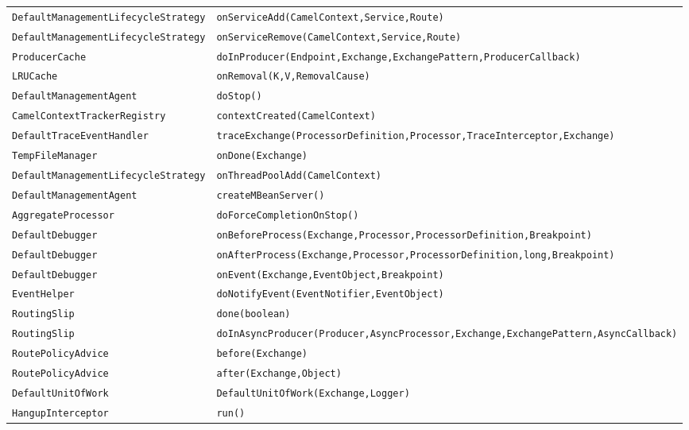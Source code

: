 \begin{center}
\begin{longtable}{ll}
\lstinline/DefaultManagementLifecycleStrategy/&{\lstinline/onServiceAdd(CamelContext,Service,Route)/}\\
\lstinline/DefaultManagementLifecycleStrategy/&{\lstinline/onServiceRemove(CamelContext,Service,Route)/}\\
\lstinline/ProducerCache/&{\lstinline/doInProducer(Endpoint,Exchange,ExchangePattern,ProducerCallback)/}\\
\lstinline/LRUCache/&{\lstinline/onRemoval(K,V,RemovalCause)/}\\
\lstinline/DefaultManagementAgent/&{\lstinline/doStop()/}\\
\lstinline/CamelContextTrackerRegistry/&{\lstinline/contextCreated(CamelContext)/}\\
\lstinline/DefaultTraceEventHandler/&{\lstinline/traceExchange(ProcessorDefinition,Processor,TraceInterceptor,Exchange)/}\\
\lstinline/TempFileManager/&{\lstinline/onDone(Exchange)/}\\
\lstinline/DefaultManagementLifecycleStrategy/&{\lstinline/onThreadPoolAdd(CamelContext)/}\\
\lstinline/DefaultManagementAgent/&{\lstinline/createMBeanServer()/}\\
\lstinline/AggregateProcessor/&{\lstinline/doForceCompletionOnStop()/}\\
\lstinline/DefaultDebugger/&{\lstinline/onBeforeProcess(Exchange,Processor,ProcessorDefinition,Breakpoint)/}\\
\lstinline/DefaultDebugger/&{\lstinline/onAfterProcess(Exchange,Processor,ProcessorDefinition,long,Breakpoint)/}\\
\lstinline/DefaultDebugger/&{\lstinline/onEvent(Exchange,EventObject,Breakpoint)/}\\
\lstinline/EventHelper/&{\lstinline/doNotifyEvent(EventNotifier,EventObject)/}\\
\lstinline/RoutingSlip/&{\lstinline/done(boolean)/}\\
\lstinline/RoutingSlip/&{\lstinline/doInAsyncProducer(Producer,AsyncProcessor,Exchange,ExchangePattern,AsyncCallback)/}\\
\lstinline/RoutePolicyAdvice/&{\lstinline/before(Exchange)/}\\
\lstinline/RoutePolicyAdvice/&{\lstinline/after(Exchange,Object)/}\\
\lstinline/DefaultUnitOfWork/&{\lstinline/DefaultUnitOfWork(Exchange,Logger)/}\\
\lstinline/HangupInterceptor/&{\lstinline/run()/}\\

\end{longtable}
\end{center}
